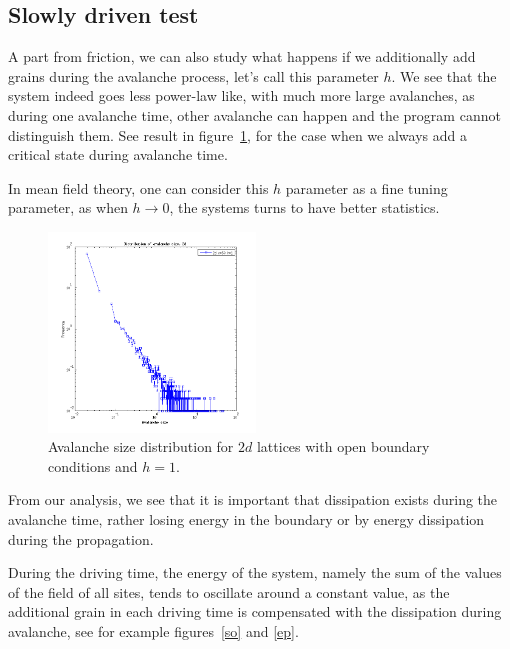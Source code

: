 \subsection{Slowly driven test}
A part from friction, we can also study what happens if we additionally add grains during the avalanche process, let's call this parameter $h$.
We see that the system indeed goes less power-law like, with much more large avalanches, as during one avalanche time, 
other avalanche can happen and the program cannot distinguish them. See result in figure~\ref{soh}, for the case when we always add a critical state during avalanche time.

In mean field theory, one can consider this $h$ parameter as a fine tuning parameter, as when $h\longrightarrow0$, the systems turns to have better statistics.

\begin{figure} 
\begin{center}
\includegraphics[width=0.49\textwidth]{results/2soh.png}
\caption{Avalanche size distribution for $2d$ lattices with open boundary conditions and $h=1$. }
\label{soh}
\end{center}
\end{figure} 

From our analysis, we see that it is important that dissipation exists during the avalanche time, rather losing energy in the boundary 
or by energy dissipation during the propagation. 

During the driving time, the energy of the system, namely the sum of the values of the field of all sites,
tends to oscillate around a constant value, as the additional grain in each driving time is compensated with the dissipation during avalanche, 
see for example figures~\ref{so} and \ref{ep}.